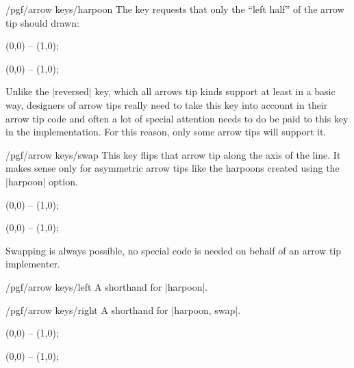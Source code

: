 \begin{key}{/pgf/arrow keys/harpoon}
    The key requests that only the ``left half'' of the arrow tip should drawn:
\begin{codeexample}[width=3cm]
 \draw [arrows = {-Stealth[harpoon]}] (0,0) -- (1,0);
\end{codeexample}
\begin{codeexample}[width=3cm]
 \draw [arrows = {->[harpoon]}] (0,0) -- (1,0);
\end{codeexample}
    Unlike the |reversed| key, which all arrows tip kinds support at least in a
    basic way, designers of arrow tips really need to take this key into
    account in their arrow tip code and often a lot of special attention needs
    to do be paid to this key in the implementation. For this reason, only some
    arrow tips will support it.
\end{key}

\begin{key}{/pgf/arrow keys/swap}
    This key flips that arrow tip along the axis of the line. It makes sense
    only for asymmetric arrow tips like the harpoons created using the
    |harpoon| option.
\begin{codeexample}[width=3cm]
 \draw [arrows = {-Stealth[harpoon]}] (0,0) -- (1,0);
\end{codeexample}
\begin{codeexample}[width=3cm]
 \draw [arrows = {-Stealth[harpoon,swap]}] (0,0) -- (1,0);
\end{codeexample}
    Swapping is always possible, no special code is needed on behalf of an
    arrow tip implementer.
\end{key}

\begin{key}{/pgf/arrow keys/left}
    A shorthand for |harpoon|.
\end{key}

\begin{key}{/pgf/arrow keys/right}
    A shorthand for |harpoon, swap|.
\begin{codeexample}[width=3cm]
 \draw [arrows = {-Stealth[left]}] (0,0) -- (1,0);
\end{codeexample}
\begin{codeexample}[width=3cm]
 \draw [arrows = {-Stealth[right]}] (0,0) -- (1,0);
\end{codeexample}
\end{key}


